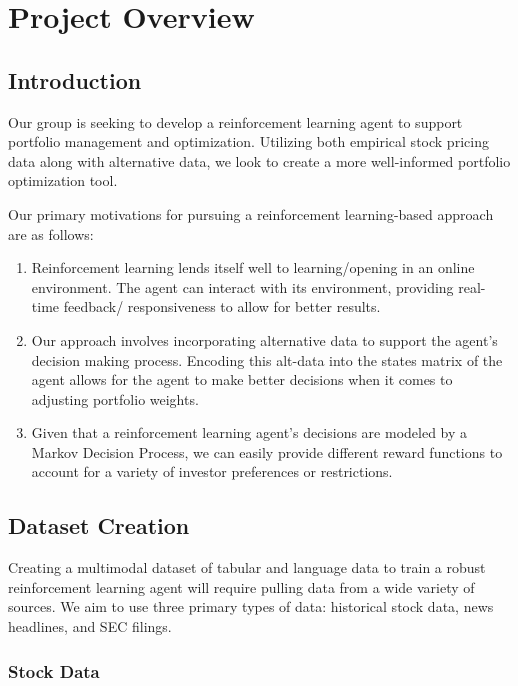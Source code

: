 \chapter{Project Overview}

\section{Introduction}

Our group is seeking to develop a reinforcement learning agent to support portfolio 
management and optimization. Utilizing both empirical stock pricing data along with 
alternative data, we look to create a more well-informed portfolio optimization tool. 

Our primary motivations for pursuing a reinforcement learning-based approach are as 
follows:

\begin{enumerate}
    \item Reinforcement learning lends itself well to learning/opening in an online environment. The agent can interact with its environment, providing real-time feedback/ responsiveness to allow for better results.
    \item Our approach involves incorporating alternative data to support the agent’s decision making process. Encoding this alt-data into the states matrix of the agent allows for the agent to make better decisions when it comes to adjusting portfolio weights.
    \item Given that a reinforcement learning agent’s decisions are modeled by a Markov Decision Process, we can easily provide different reward functions to account for a variety of investor preferences or restrictions.
\end{enumerate}




\section{Dataset Creation}

Creating a multimodal dataset of tabular and language data to train a robust reinforcement learning agent
will require pulling data from a wide variety of sources. We aim to use three primary types of data:
historical stock data, news headlines, and SEC filings.

\subsection{Stock Data}

